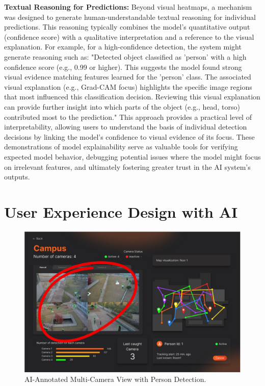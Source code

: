 \textbf{Textual Reasoning for Predictions:}
Beyond visual heatmaps, a mechanism was designed to generate human-understandable textual reasoning for individual predictions. This reasoning typically combines the model's quantitative output (confidence score) with a qualitative interpretation and a reference to the visual explanation. For example, for a high-confidence detection, the system might generate reasoning such as:
"Detected object classified as 'person' with a high confidence score (e.g., 0.99 or higher). This suggests the model found strong visual evidence matching features learned for the 'person' class. The associated visual explanation (e.g., Grad-CAM focus) highlights the specific image regions that most influenced this classification decision. Reviewing this visual explanation can provide further insight into which parts of the object (e.g., head, torso) contributed most to the prediction."
This approach provides a practical level of interpretability, allowing users to understand the basis of individual detection decisions by linking the model's confidence to visual evidence of its focus.
These demonstrations of model explainability serve as valuable tools for verifying expected model behavior, debugging potential issues where the model might focus on irrelevant features, and ultimately fostering greater trust in the AI system's outputs.

\section{User Experience Design with AI}
\label{section:ux_design} %

\begin{figure}[H]
    \centering
    \includegraphics[width=1.0\textwidth,keepaspectratio]{assets/jubjones/ai_mockup_bbox.png}
    \caption{AI-Annotated Multi-Camera View with Person Detection.}
    \label{fig:ai_mockup_bbox}
\end{figure}

